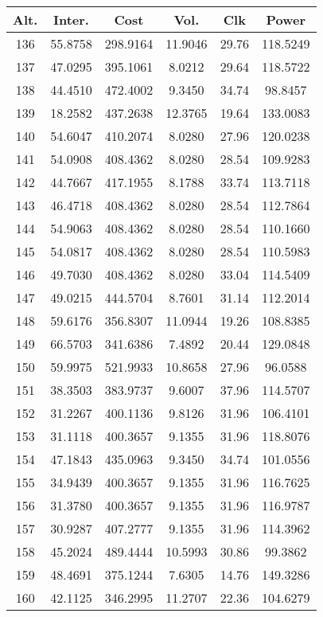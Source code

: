 \begin{center}
\begin{footnotesize}
\begin{tabular}{|c|ccccc|}
\hline
Alt. & Inter. & Cost & Vol. & Clk & Power\\
\hline
136 & 55.8758 & 298.9164 & 11.9046 & 29.76 & 118.5249 \\
137 & 47.0295 & 395.1061 & 8.0212 & 29.64 & 118.5722 \\
138 & 44.4510 & 472.4002 & 9.3450 & 34.74 & 98.8457 \\
139 & 18.2582 & 437.2638 & 12.3765 & 19.64 & 133.0083 \\
140 & 54.6047 & 410.2074 & 8.0280 & 27.96 & 120.0238 \\
141 & 54.0908 & 408.4362 & 8.0280 & 28.54 & 109.9283 \\
142 & 44.7667 & 417.1955 & 8.1788 & 33.74 & 113.7118 \\
143 & 46.4718 & 408.4362 & 8.0280 & 28.54 & 112.7864 \\
144 & 54.9063 & 408.4362 & 8.0280 & 28.54 & 110.1660 \\
145 & 54.0817 & 408.4362 & 8.0280 & 28.54 & 110.5983 \\
146 & 49.7030 & 408.4362 & 8.0280 & 33.04 & 114.5409 \\
147 & 49.0215 & 444.5704 & 8.7601 & 31.14 & 112.2014 \\
148 & 59.6176 & 356.8307 & 11.0944 & 19.26 & 108.8385 \\
149 & 66.5703 & 341.6386 & 7.4892 & 20.44 & 129.0848 \\
150 & 59.9975 & 521.9933 & 10.8658 & 27.96 & 96.0588 \\
151 & 38.3503 & 383.9737 & 9.6007 & 37.96 & 114.5707 \\
152 & 31.2267 & 400.1136 & 9.8126 & 31.96 & 106.4101 \\
153 & 31.1118 & 400.3657 & 9.1355 & 31.96 & 118.8076 \\
154 & 47.1843 & 435.0963 & 9.3450 & 34.74 & 101.0556 \\
155 & 34.9439 & 400.3657 & 9.1355 & 31.96 & 116.7625 \\
156 & 31.3780 & 400.3657 & 9.1355 & 31.96 & 116.9787 \\
157 & 30.9287 & 407.2777 & 9.1355 & 31.96 & 114.3962 \\
158 & 45.2024 & 489.4444 & 10.5993 & 30.86 & 99.3862 \\
159 & 48.4691 & 375.1244 & 7.6305 & 14.76 & 149.3286 \\
160 & 42.1125 & 346.2995 & 11.2707 & 22.36 & 104.6279 \\

\end{tabular}
\end{footnotesize}
\end{center}
